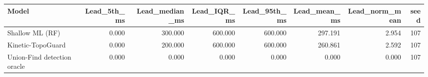 \begin{tabular}{lrrrrrrr}
\toprule
Model & Lead\_5th\_ms & Lead\_median\_ms & Lead\_IQR\_ms & Lead\_95th\_ms & Lead\_mean\_ms & Lead\_norm\_mean & seed \\
\midrule
Shallow ML (RF) & 0.000 & 300.000 & 600.000 & 600.000 & 297.191 & 2.954 & 107 \\
Kinetic-TopoGuard & 0.000 & 200.000 & 600.000 & 600.000 & 260.861 & 2.592 & 107 \\
Union-Find detection oracle & 0.000 & 0.000 & 0.000 & 0.000 & 0.000 & 0.000 & 107 \\
\bottomrule
\end{tabular}